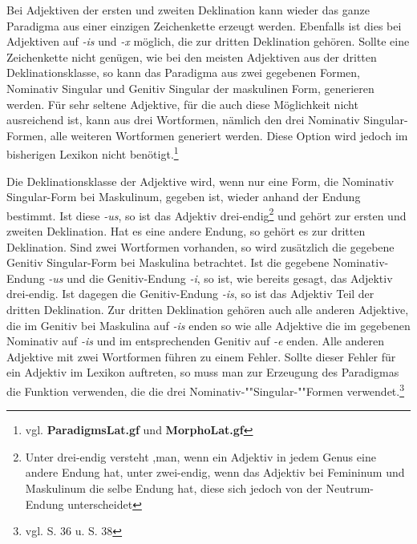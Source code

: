 Bei Adjektiven der ersten und zweiten Deklination kann wieder das ganze Paradigma aus einer einzigen Zeichenkette erzeugt werden. Ebenfalls ist dies bei Adjektiven auf \textit{-is} und \textit{-x} möglich, die zur dritten Deklination gehören. Sollte eine Zeichenkette nicht genügen, wie bei den meisten Adjektiven aus der dritten Deklinationsklasse, so kann das Paradigma aus zwei gegebenen Formen, Nominativ Singular und Genitiv Singular der maskulinen Form, generieren werden. Für sehr seltene Adjektive, für die auch diese Möglichkeit nicht ausreichend ist, kann aus drei Wortformen, nämlich den drei Nominativ Singular-Formen, alle weiteren Wortformen generiert werden. Diese Option wird jedoch im bisherigen Lexikon nicht benötigt.\footnote{vgl. \textbf{ParadigmsLat.gf} und \textbf{MorphoLat.gf}} \par
Die Deklinationsklasse der Adjektive wird, wenn nur eine Form, die Nominativ Singular-Form bei Maskulinum, gegeben ist, wieder anhand der Endung bestimmt. Ist diese \textit{-us}, so ist das Adjektiv drei-endig\footnote{Unter drei-endig versteht ,man, wenn ein Adjektiv in jedem Genus eine andere Endung hat, unter zwei-endig, wenn das Adjektiv bei Femininum und Maskulinum die selbe Endung hat, diese sich jedoch von der Neutrum-Endung unterscheidet} und gehört zur ersten und zweiten Deklination. Hat es eine andere Endung, so gehört es zur dritten Deklination. Sind zwei Wortformen vorhanden, so wird zusätzlich die gegebene Genitiv Singular-Form bei Maskulina betrachtet. Ist die gegebene Nominativ-Endung \textit{-us} und die Genitiv-Endung \textit{-i}, so ist, wie bereits gesagt, das Adjektiv drei-endig. Ist dagegen die Genitiv-Endung \textit{-is}, so ist das Adjektiv Teil der dritten Deklination. Zur dritten Deklination gehören auch alle anderen Adjektive, die im Genitiv bei Maskulina auf \textit{-is} enden so wie alle Adjektive die im gegebenen Nominativ auf \textit{-is} und im entsprechenden Genitiv auf \textit{-e} enden. Alle anderen Adjektive mit zwei Wortformen führen zu einem Fehler. Sollte dieser Fehler für ein Adjektiv im Lexikon auftreten, so muss man zur Erzeugung des Paradigmas die Funktion verwenden, die die drei Nominativ-""Singular-""Formen verwendet.\footnote{vgl. \cite{BAYER-LINDAUER1994} S. 36 u. S. 38} \par
